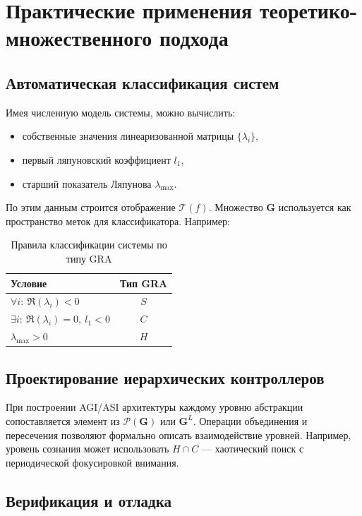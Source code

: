 \documentclass[12pt,a4paper]{article}
\newcommand{\G}{\mathbf{G}}
\newcommand{\T}{\mathcal{T}}
\newcommand{\Pset}{\mathcal{P}}
\begin{document}
\section{Практические применения теоретико-множественного подхода}
\label{sec:applications}

\subsection{Автоматическая классификация систем}

Имея численную модель системы, можно вычислить:
\begin{itemize}
    \item собственные значения линеаризованной матрицы $\{\lambda_i\}$,
    \item первый ляпуновский коэффициент $l_1$,
    \item старший показатель Ляпунова $\lambda_{\max}$.
\end{itemize}

По этим данным строится отображение $\T(f)$. Множество $\G$ используется как пространство меток для классификатора. Например:

\begin{table}[h!]
\centering
\caption{Правила классификации системы по типу GRA}
\label{tab:classification}
\begin{tabular}{@{}lc@{}}
\toprule
Условие & Тип GRA \\
\midrule
$\forall i:\ \Re(\lambda_i) < 0$ & $S$ \\
$\exists i:\ \Re(\lambda_i) = 0,\ l_1 < 0$ & $C$ \\
$\lambda_{\max} > 0$ & $H$ \\
\bottomrule
\end{tabular}
\end{table}

\subsection{Проектирование иерархических контроллеров}

При построении AGI/ASI архитектуры каждому уровню абстракции сопоставляется элемент из $\Pset(\G)$ или $\G^L$. Операции объединения и пересечения позволяют формально описать взаимодействие уровней. Например, уровень сознания может использовать $H \cap C$ — хаотический поиск с периодической фокусировкой внимания.

\subsection{Верификация и отладка}
\end{document}
